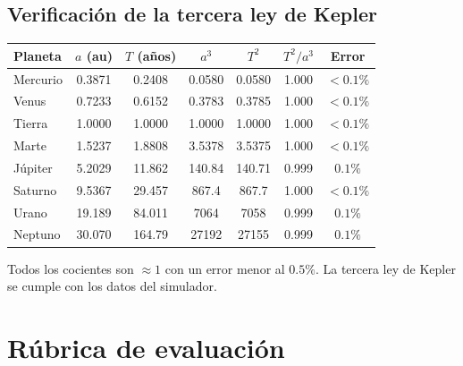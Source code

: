 \documentclass[11pt,a4paper]{article}
\theoremstyle{definition}
\begin{document}
\subsection*{Verificación de la tercera ley de Kepler}

\begin{center}
\begin{tabular}{@{}lcccccc@{}}
\toprule
\textbf{Planeta} & $a$ (\si{\astronomicalunit}) & $T$ (años) & $a^{3}$ & $T^{2}$ & $T^{2}/a^{3}$ & \textbf{Error} \\
\midrule
Mercurio & 0.3871 & 0.2408 & 0.0580 & 0.0580 & 1.000 & $<0.1\%$ \\
Venus    & 0.7233 & 0.6152 & 0.3783 & 0.3785 & 1.000 & $<0.1\%$ \\
Tierra   & 1.0000 & 1.0000 & 1.0000 & 1.0000 & 1.000 & $<0.1\%$ \\
Marte    & 1.5237 & 1.8808 & 3.5378 & 3.5375 & 1.000 & $<0.1\%$ \\
Júpiter  & 5.2029 & 11.862 & 140.84 & 140.71 & 0.999 & $0.1\%$ \\
Saturno  & 9.5367 & 29.457 & 867.4  & 867.7  & 1.000 & $<0.1\%$ \\
Urano    & 19.189 & 84.011 & 7064   & 7058   & 0.999 & $0.1\%$ \\
Neptuno  & 30.070 & 164.79 & 27192  & 27155  & 0.999 & $0.1\%$ \\
\bottomrule
\end{tabular}
\end{center}

\noindent Todos los cocientes son $\approx 1$ con un error menor al $0.5\%$. La tercera ley de Kepler se cumple con los datos del simulador.

\section{Rúbrica de evaluación}\label{ap:rubrica}
\end{document}
